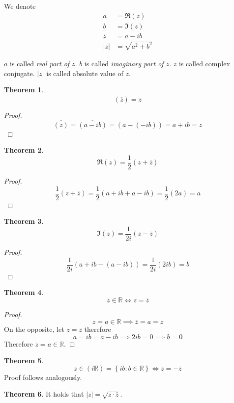 \documentclass[a4paper,landscape,twocolumn]{article}
\theoremstyle{definition}
\newtheorem{theorem}{Theorem}
\newcommand\set[1]{\left\{#1\right\}}
\newcommand\abs[1]{\left|#1\right|}
\begin{document}
We denote
\begin{align*}
  a &= \Re(z) \\
  b &= \Im(z) \\
  \overline{z} &= a - ib \\
  \abs{z} &= \sqrt{a^2 + b^2}
\end{align*}

$a$ is called \emph{real part of $z$}. $b$ is called \emph{imaginary part of $z$}.
$z$ is called complex conjugate. $\abs{z}$ is called absolute value of $z$.

\begin{theorem}
  \[  \overline{(\overline{z})} = z  \]
\end{theorem}

\begin{proof}
  \[ \overline{(\overline{z})} = \overline{(a - ib)} = (a - (-ib)) = a + ib  = z \]
\end{proof}

\begin{theorem}
  \[ \Re(z) = \frac12 (z + \overline z) \]
\end{theorem}

\begin{proof}
  \[ \frac12(z + \overline{z}) = \frac12(a + ib + a - ib) = \frac12 (2a) = a \]
\end{proof}

\begin{theorem}
  \[ \Im(z) = \frac{1}{2i} (z - \overline{z}) \]
\end{theorem}

\begin{proof}
  \[ \frac{1}{2i} (a + ib - (a - ib)) = \frac{1}{2i} (2ib) = b \]
\end{proof}

\begin{theorem}
  \[ z \in \mathbb R \iff z = \overline{z} \]
\end{theorem}
\begin{proof}
  \[ z = a \in \mathbb R \implies \overline{z} = a = z \]
  On the opposite, let $z = \overline{z}$ therefore
  \[ a = ib = a - ib \implies 2ib = 0 \implies b = 0 \]
  Therefore $z = a \in \mathbb R$.
\end{proof}

\begin{theorem}
  \[ z \in (i \mathbb R) = \set{ib : b \in \mathbb R} \iff z = -\overline{z} \]
  Proof follows analogously.
\end{theorem}

\begin{theorem}
  It holds that $\abs{z} = \sqrt{z \cdot \overline{z}}$.
\end{theorem}
\end{document}
